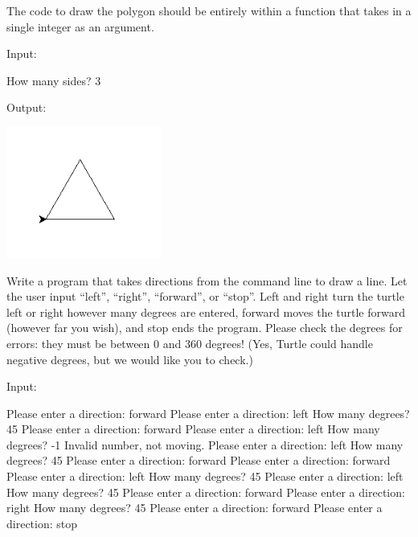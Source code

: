 \documentclass[11pt]{cselabheader}
\begin{document}
{\begin{ex}[polygons2.py]
    The code to draw the polygon should be entirely within a function that takes
    in a single integer as an argument.

    Input:

    \begin{verbatimcode}
How many sides? 3
    \end{verbatimcode}

    Output:
    \begin{center}
      \includegraphics[width=2.0in]{img/triangle}
    \end{center}
\end{ex}

\begin{ex}[navigate.py] Write a program that takes directions from the command line
    to draw a line. Let the user input ``left'', ``right'', ``forward'', or
    ``stop''. Left and right turn the turtle left or right however many degrees
    are entered, forward moves the turtle forward (however far you wish), and
    stop ends the program. Please check the degrees for errors: they must be
    between 0 and 360 degrees! (Yes, Turtle could handle negative degrees, but
    we would like you to check.)

    Input:

  \begin{verbatimcode}
Please enter a direction: forward
Please enter a direction: left
How many degrees? 45
Please enter a direction: forward
Please enter a direction: left
How many degrees? -1
Invalid number, not moving.
Please enter a direction: left
How many degrees? 45
Please enter a direction: forward
Please enter a direction: forward
Please enter a direction: left
How many degrees? 45
Please enter a direction: left
How many degrees? 45
Please enter a direction: forward
Please enter a direction: right
How many degrees? 45
Please enter a direction: forward
Please enter a direction: stop
  \end{verbatimcode}


\end{ex}}
\end{document}
